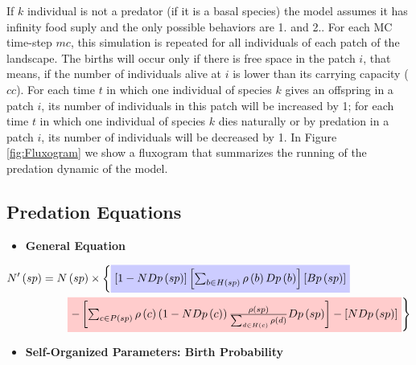 If $k$ individual is not a predator (if it is a basal species) the model assumes it has infinity food suply and the only possible behaviors are 1. and 2.. For each MC time-step $mc$, this simulation is repeated for all individuals of each patch of the landscape. The births will occur only if there is free space in the patch $i$, that means, if the number of individuals alive at $i$ is lower than its carrying capacity ($cc$). For each time $t$ in which one individual of species $k$ gives an offspring in a patch $i$, its number of individuals in this patch will be increased by 1; for each time $t$ in which one individual of species $k$ dies naturally or by predation in a patch $i$, its number of individuals will be decreased by 1. In Figure \ref{fig:Fluxogram} we show a fluxogram that summarizes the running of the predation dynamic of the model. 

\vspace{0.25cm}
\subsection*{Predation Equations}

\vspace{0.25cm}
\begin{itemize}
\item \textbf{General Equation}
\end{itemize}

\begin{align*}
 N^\prime\left(sp\right) & = N\left(sp\right) \times \left\{ \tikz[baseline]{\node[fill=blue!20,anchor=base] (t1) { $\left[ 1 - NDp\left(sp\right) \right]\left[ \sum_{b \in H\left(sp\right)}\rho\left(b\right)Dp\left(b\right) \right]\left[Bp\left(sp\right)\right]$ };}  \right.\nonumber  \\
 &\qquad \left. \tikz[baseline]{\node[fill=red!20,anchor=base] (t2) {$- \left[\sum_{c \in P\left(sp\right)}\rho\left(c\right)\left( 1-NDp \left(c \right) \right)\frac{\rho\left(sp\right)}{\sum_{d \in H\left(c\right)}\rho\left(d\right)}Dp\left(sp\right)\right]-\left[NDp\left(sp\right)\right]$ };} \right\} 
\end{align*}

\vspace{1cm}
\begin{itemize}
\item \textbf{Self-Organized Parameters: Birth Probability}
\end{itemize}

